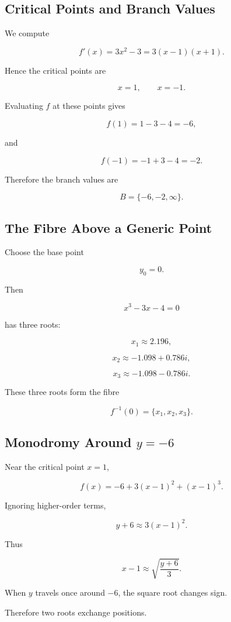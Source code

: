 \documentclass[12pt,a4paper]{article}
\theoremstyle{notespace}
\begin{document}
\subsection{Critical Points and Branch Values}

We compute

\[
f'(x)=3x^2-3
=
3(x-1)(x+1).
\]

Hence the critical points are

\[
x=1,
\qquad
x=-1.
\]

Evaluating \(f\) at these points gives

\[
f(1)=1-3-4=-6,
\]

and

\[
f(-1)=-1+3-4=-2.
\]

Therefore the branch values are

\[
\boxed{
	B=\{-6,-2,\infty\}.
}
\]

\subsection{The Fibre Above a Generic Point}

Choose the base point

\[
y_0=0.
\]

Then

\[
x^3-3x-4=0
\]

has three roots:

\[
x_1\approx 2.196,
\]

\[
x_2\approx -1.098+0.786i,
\]

\[
x_3\approx -1.098-0.786i.
\]

These three roots form the fibre

\[
f^{-1}(0)
=
\{x_1,x_2,x_3\}.
\]

\subsection{Monodromy Around \texorpdfstring{$y=-6$}{y=-6}}

Near the critical point \(x=1\),

\[
f(x)
=
-6
+
3(x-1)^2
+
(x-1)^3.
\]

Ignoring higher-order terms,

\[
y+6
\approx
3(x-1)^2.
\]

Thus

\[
x-1
\approx
\sqrt{\frac{y+6}{3}}.
\]

When \(y\) travels once around \(-6\), the square root changes sign.

Therefore two roots exchange positions.
\end{document}
